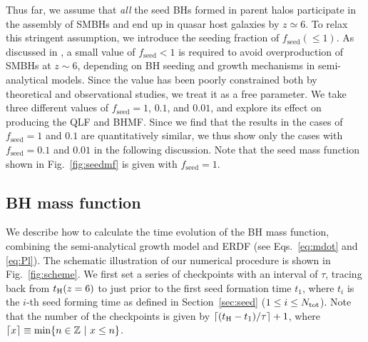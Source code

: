 \documentclass[twocolumn, twocolappendix]{aastex63}
\newcommand{\tlife}{\tau}
\newcommand{\fseed}{f_\mathrm{seed}}
\begin{document}
\begin{CJK*}{UTF8}{gbsn}
Thus far, we assume that {\it all} the seed BHs formed in parent halos participate in the assembly of SMBHs and 
end up in quasar host galaxies by $z\simeq 6$.
To relax this stringent assumption, we introduce the seeding fraction of $\fseed (\leq 1)$.
As discussed in \citet{2009ApJ...696.1798T}, a small value of $\fseed <1$ is required to avoid overproduction of SMBHs at $z\sim 6$,
depending on BH seeding and growth mechanisms in semi-analytical models.
Since the value has been poorly constrained both by theoretical and observational studies, we treat it as a free parameter.
We take three different values of $\fseed = 1$, $0.1$, and $0.01$, and explore its effect on producing the QLF and BHMF.
Since we find that the results in the cases of $\fseed = 1$ and $0.1$ are quantitatively similar,
we thus show only the cases with $\fseed=0.1$ and $0.01$ in the following discussion.
Note that the seed mass function shown in Fig.~\ref{fig:seedmf} is given with $\fseed = 1$.


\vspace{2mm}
\subsection{BH mass function}\label{sec:MF}

We describe how to calculate the time evolution of the BH mass function, 
combining the semi-analytical growth model and ERDF (see Eqs.~\ref{eq:mdot} and \ref{eq:Pl}).
The schematic illustration of our numerical procedure is shown in Fig.~\ref{fig:scheme}. 
We first set a series of checkpoints with an interval of $\tlife$, 
tracing back from $t_{\rm H}(z=6)$ to just prior to the first seed formation time $t_1$, where $t_i$ is the $i$-th seed forming time
as defined in Section~\ref{sec:seed} ($1\leq i\leq N_{\rm tot}$).
Note that the number of the checkpoints is given by $\lceil (t_{\rm H}-t_1)/\tau \rceil+1$, where $\lceil x\rceil \equiv {\rm min}\{n \in \mathbb{Z}~ |~x\leq n\}$.



\end{CJK*}
\end{document}
